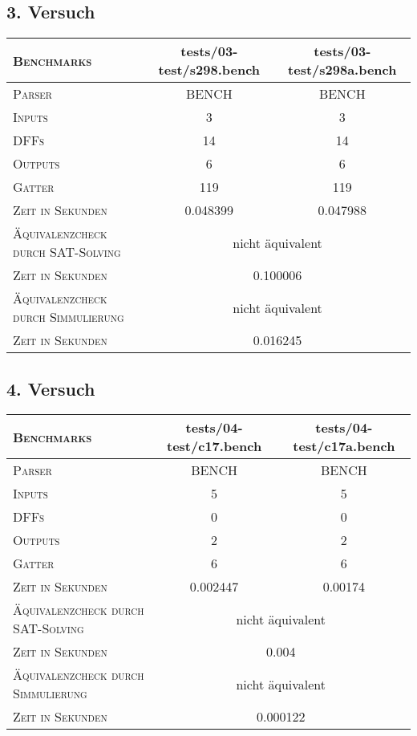\subsection{3. Versuch}

\begin{tabular}{|l|c|c|}
	\hline
	\textsc{Benchmarks} & tests/03-test/s298.bench & tests/03-test/s298a.bench \\
	\hline
	\hline
	\textsc{Parser} & BENCH & BENCH \\
	\hline
	\textsc{Inputs} & 3 & 3 \\
	\hline
	\textsc{DFFs} & 14 & 14 \\
	\hline
	\textsc{Outputs} & 6 & 6 \\
	\hline
	\textsc{Gatter} & 119 & 119 \\		
	\hline
	\textsc{Zeit in Sekunden} & 0.048399 &  0.047988 \\ 
	\hline
	\hline
	\textsc{Äquivalenzcheck durch SAT-Solving} & \multicolumn{2}{|c|}{nicht äquivalent} \\
	\hline
	\textsc{Zeit in Sekunden} & \multicolumn{2}{|c|}{0.100006} \\
	\hline
	\hline
	\textsc{Äquivalenzcheck durch Simmulierung} & \multicolumn{2}{|c|}{nicht äquivalent} \\
	\hline
	\textsc{Zeit in Sekunden} & \multicolumn{2}{|c|}{0.016245} \\
	\hline
\end{tabular}

\subsection{4. Versuch}

\begin{tabular}{|l|c|c|}
	\hline
	\textsc{Benchmarks} & tests/04-test/c17.bench & tests/04-test/c17a.bench \\
	\hline
	\hline
	\textsc{Parser} & BENCH & BENCH \\
	\hline
	\textsc{Inputs} & 5 & 5 \\
	\hline
	\textsc{DFFs} & 0 & 0 \\
	\hline
	\textsc{Outputs} & 2 & 2 \\
	\hline
	\textsc{Gatter} & 6 & 6 \\		
	\hline
	\textsc{Zeit in Sekunden} & 0.002447 & 0.00174 \\ 
	\hline
	\hline
	\textsc{Äquivalenzcheck durch SAT-Solving} & \multicolumn{2}{|c|}{nicht äquivalent} \\
	\hline
	\textsc{Zeit in Sekunden} & \multicolumn{2}{|c|}{0.004} \\
	\hline
	\hline
	\textsc{Äquivalenzcheck durch Simmulierung} & \multicolumn{2}{|c|}{nicht äquivalent} \\
	\hline
	\textsc{Zeit in Sekunden} & \multicolumn{2}{|c|}{0.000122} \\
	\hline
\end{tabular}

